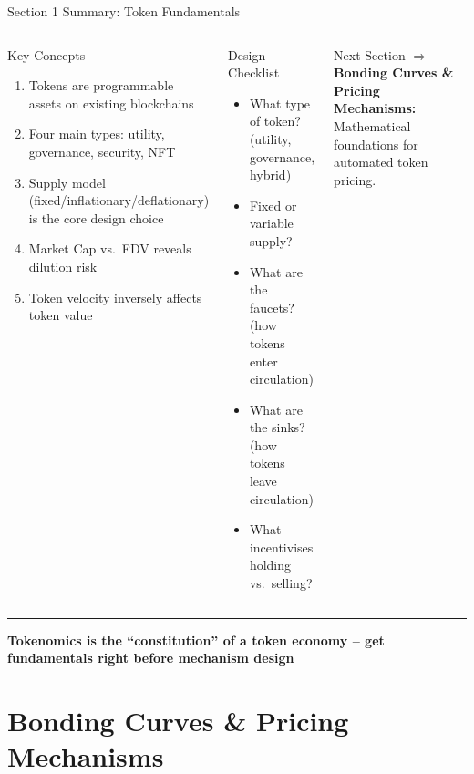 \documentclass[8pt,aspectratio=169]{beamer}
\newcommand{\bottomnote}[1]{\vfill\vspace{-2mm}\textcolor{mllavender2}{\rule{\textwidth}{0.4pt}}\vspace{1mm}\footnotesize\textbf{#1}}
\begin{document}
\begin{frame}{Section 1 Summary: Token Fundamentals}
\begin{columns}[T]
\begin{block}{Key Concepts}
\footnotesize
\begin{enumerate}
  \item Tokens are programmable assets on existing blockchains
  \item Four main types: utility, governance, security, NFT
  \item Supply model (fixed/inflationary/deflationary) is the core design choice
  \item Market Cap vs.\ FDV reveals dilution risk
  \item Token velocity inversely affects token value
\end{enumerate}
\end{block}

\begin{block}{Design Checklist}
\footnotesize
\begin{itemize}
  \item[\checkmark] What type of token? (utility, governance, hybrid)
  \item[\checkmark] Fixed or variable supply?
  \item[\checkmark] What are the faucets? (how tokens enter circulation)
  \item[\checkmark] What are the sinks? (how tokens leave circulation)
  \item[\checkmark] What incentivises holding vs.\ selling?
\end{itemize}
\end{block}
\vspace{2mm}
\begin{exampleblock}{\footnotesize Next Section}
\footnotesize
$\Rightarrow$ \textbf{Bonding Curves \& Pricing Mechanisms:} Mathematical foundations for automated token pricing.
\end{exampleblock}
\end{columns}
\bottomnote{Tokenomics is the ``constitution'' of a token economy -- get fundamentals right before mechanism design}
\end{frame}

\section{Bonding Curves \& Pricing Mechanisms}
\end{document}
